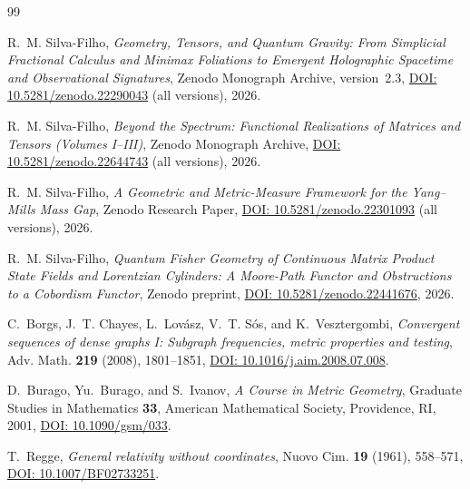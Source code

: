 \documentclass[11pt,a4paper,reqno]{amsart}
\theoremstyle{definition}
\numberwithin{equation}{section}
\begin{document}

\begin{thebibliography}{99}

R.~M. Silva-Filho,
\emph{Geometry, Tensors, and Quantum Gravity: From Simplicial Fractional Calculus and Minimax Foliations to Emergent Holographic Spacetime and Observational Signatures},
Zenodo Monograph Archive, version~2.3, \href{https://doi.org/10.5281/zenodo.22290043}{DOI: 10.5281/zenodo.22290043} (all versions), 2026.

R.~M. Silva-Filho,
\emph{Beyond the Spectrum: Functional Realizations of Matrices and Tensors (Volumes I--III)},
Zenodo Monograph Archive, \href{https://doi.org/10.5281/zenodo.22644743}{DOI: 10.5281/zenodo.22644743} (all versions), 2026.

R.~M. Silva-Filho,
\emph{A Geometric and Metric-Measure Framework for the Yang--Mills Mass Gap},
Zenodo Research Paper, \href{https://doi.org/10.5281/zenodo.22301093}{DOI: 10.5281/zenodo.22301093} (all versions), 2026.

R.~M. Silva-Filho,
\emph{Quantum Fisher Geometry of Continuous Matrix Product State Fields and Lorentzian Cylinders: A Moore-Path Functor and Obstructions to a Cobordism Functor},
Zenodo preprint, \href{https://doi.org/10.5281/zenodo.22441676}{DOI: 10.5281/zenodo.22441676}, 2026.

C.~Borgs, J.~T. Chayes, L.~Lov\'asz, V.~T. S\'os, and K.~Vesztergombi,
\emph{Convergent sequences of dense graphs I: Subgraph frequencies, metric properties and testing},
Adv. Math. \textbf{219} (2008), 1801--1851, \href{https://doi.org/10.1016/j.aim.2008.07.008}{DOI: 10.1016/j.aim.2008.07.008}.

D.~Burago, Yu.~Burago, and S.~Ivanov,
\emph{A Course in Metric Geometry},
Graduate Studies in Mathematics \textbf{33}, American Mathematical Society, Providence, RI, 2001, \href{https://doi.org/10.1090/gsm/033}{DOI: 10.1090/gsm/033}.

T.~Regge,
\emph{General relativity without coordinates},
Nuovo Cim. \textbf{19} (1961), 558--571, \href{https://doi.org/10.1007/BF02733251}{DOI: 10.1007/BF02733251}.


\end{thebibliography}
\end{document}
